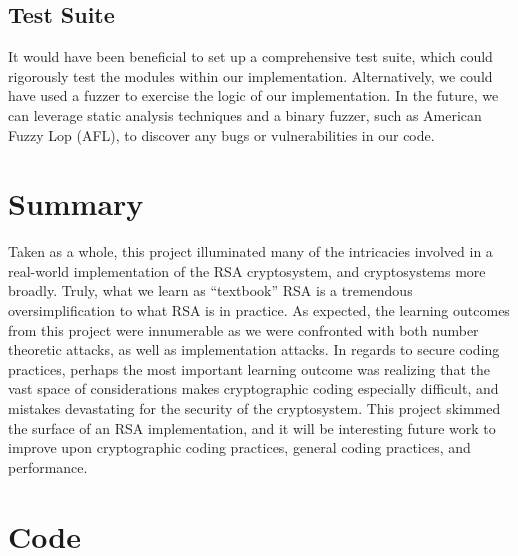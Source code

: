 \documentclass[a4paper]{article}
\begin{document}
\subsection{Test Suite}

It would have been beneficial to set up a comprehensive test suite, which could rigorously test the modules within our implementation. Alternatively, we could have used a fuzzer to exercise the logic of our implementation. In the future, we can leverage static analysis techniques and a binary fuzzer, such as American Fuzzy Lop (AFL), to discover any bugs or vulnerabilities in our code.

\section{Summary}

Taken as a whole, this project illuminated many of the intricacies involved in a real-world implementation of the RSA cryptosystem, and cryptosystems more broadly. Truly, what we learn as ``textbook'' RSA is a tremendous oversimplification to what RSA is in practice. As expected, the learning outcomes from this project were innumerable as we were confronted with both number theoretic attacks, as well as implementation attacks. In regards to secure coding practices, perhaps the most
important learning outcome was realizing that the vast space of considerations makes cryptographic coding especially difficult, and mistakes devastating for the security of the cryptosystem. This project skimmed the surface of an RSA implementation, and it will be interesting future work to improve upon cryptographic coding practices, general coding practices, and performance.




\appendix

\section{Code}






\end{document}
